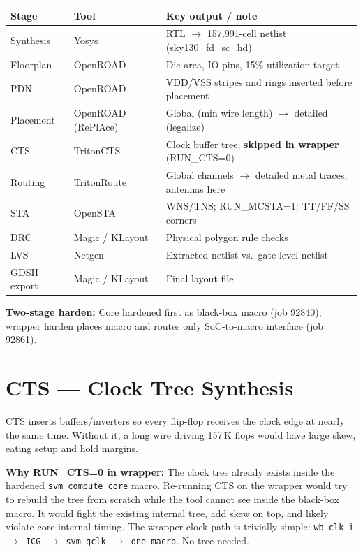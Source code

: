 \documentclass[10pt]{article}
\begin{document}
\begin{center}
\small
\begin{tabular}{lll}
\toprule
Stage & Tool & Key output / note \\
\midrule
Synthesis & Yosys & RTL $\to$ 157,991-cell netlist (sky130\_fd\_sc\_hd) \\
Floorplan & OpenROAD & Die area, IO pins, 15\% utilization target \\
PDN & OpenROAD & VDD/VSS stripes and rings inserted before placement \\
Placement & OpenROAD (RePlAce) & Global (min wire length) $\to$ detailed (legalize) \\
CTS & TritonCTS & Clock buffer tree; \textbf{skipped in wrapper} (RUN\_CTS=0) \\
Routing & TritonRoute & Global channels $\to$ detailed metal traces; antennas here \\
STA & OpenSTA & WNS/TNS; RUN\_MCSTA=1: TT/FF/SS corners \\
DRC & Magic / KLayout & Physical polygon rule checks \\
LVS & Netgen & Extracted netlist vs.\ gate-level netlist \\
GDSII export & Magic / KLayout & Final layout file \\
\bottomrule
\end{tabular}
\end{center}

\textbf{Two-stage harden:} Core hardened first as black-box macro (job 92840);
wrapper harden places macro and routes only SoC-to-macro interface (job 92861).

\section{CTS --- Clock Tree Synthesis}

CTS inserts buffers/inverters so every flip-flop receives the clock edge at
nearly the same time. Without it, a long wire driving 157\,K flops would have
large skew, eating setup and hold margins.

\textbf{Why RUN\_CTS=0 in wrapper:} The clock tree already exists inside the
hardened \texttt{svm\_compute\_core} macro. Re-running CTS on the wrapper would
try to rebuild the tree from scratch while the tool cannot see inside the
black-box macro. It would fight the existing internal tree, add skew on top,
and likely violate core internal timing. The wrapper clock path is trivially
simple: \texttt{wb\_clk\_i $\to$ ICG $\to$ svm\_gclk $\to$ one macro}. No tree needed.
\end{document}
